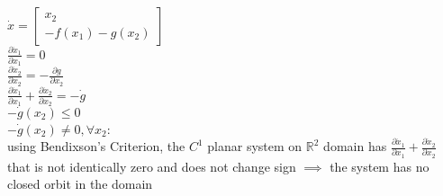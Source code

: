 \documentclass[12pt,letter]{article}
\newcommand{\R}{\mathbb{R}}
\begin{document}
\begin{itemize}

    
    $\dot{x}=\begin{bmatrix} x_2 \\ -f(x_1) -g(x_2) \end{bmatrix}$\\

    $\frac{\partial \dot{x}_1 }{\partial x_1}=0$\\
    $\frac{\partial \dot{x}_2 }{\partial x_2}=-\frac{\partial g}{\partial x_2}$\\
    $\frac{\partial \dot{x}_1 }{\partial x_1} + \frac{\partial \dot{x}_2 }{\partial x_2} = -\dot{g}$\\
    
    $-\dot{g}(x_2) \leq 0$\\
    $-\dot{g}(x_2) \neq 0, \forall x_2$:\\
    
    using Bendixson's Criterion, the $C^1$ planar system on $\R^2$ domain has $\frac{\partial \dot{x}_1 }{\partial x_1} + \frac{\partial \dot{x}_2 }{\partial x_2}$ that is not identically zero and does not change sign $\implies$ the system has no closed orbit in the domain\\



    
    
    
  \end{itemize}
\end{document}
